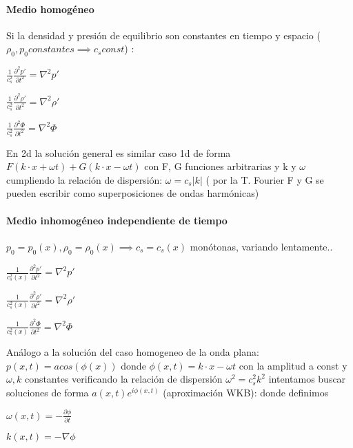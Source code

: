 \documentclass{article}
\begin{document}
\paragraph{Medio homogéneo}

\begin{description}  
\item Si la densidad y presión de equilibrio son constantes en tiempo y espacio ($\rho_0, p_0 constantes \implies c_s const$) :
\item $\frac{1}{c_s^{2}} \frac{\partial^{2} p\prime}{\partial t^{2}} = \nabla^{2} p\prime    $
\item $\frac{1}{c_s^{2}} \frac{\partial^{2} \rho\prime}{\partial t^{2}} = \nabla^{2} \rho\prime    $
\item $\frac{1}{c_s^{2}} \frac{\partial^{2} \Phi}{\partial t^{2}} = \nabla^{2} \Phi    $
\item En 2d  la solución general es similar caso 1d de forma $F(k\cdot x+ \omega t) + G(k \cdot x- \omega t)$ con F, G funciones arbitrarias y  k y $\omega$ cumpliendo la relación de dispersión: $\omega = c_s |k|$ 
( por la T. Fourier F y G se pueden escribir como superposiciones de ondas harmónicas) 

\end{description}  


\paragraph{Medio inhomogéneo independiente de tiempo} $p_0 = p_0(x),\rho_0 = \rho_0(x)\implies c_s = c_s(x)$ monótonas, variando lentamente..
\begin{description}  
\item $\frac{1}{c_s^{2}(x)} \frac{\partial^{2} p\prime}{\partial t^{2}} = \nabla^{2} p\prime    $
\item $\frac{1}{c_s^{2}(x)} \frac{\partial^{2} \rho\prime}{\partial t^{2}} = \nabla^{2} \rho\prime    $
\item $\frac{1}{c_s^{2}(x)} \frac{\partial^{2} \Phi}{\partial t^{2}} = \nabla^{2} \Phi    $
\item Análogo a la solución del caso homogeneo de la onda plana:
 $p(x,t)=a cos(\phi(x))$ donde $\phi(x,t) = k\cdot x-\omega t$ con la amplitud a const y $\omega, k$ constantes verificando la relación de dispersión $\omega^{2} = c_s^2 k^2  $ intentamos  buscar soluciones de forma $a(x,t) e^{i\phi(x,t)}$ (aproximación WKB): 
 donde definimos 
\item $\omega(x,t) = -\frac{\partial \phi}{\partial t}$
\item $k(x,t) = -\nabla \phi$
\end{description}
\end{document}
